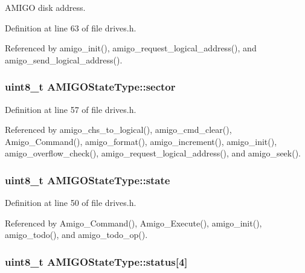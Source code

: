 A\+M\+I\+GO disk address. 



Definition at line 63 of file drives.\+h.



Referenced by amigo\+\_\+init(), amigo\+\_\+request\+\_\+logical\+\_\+address(), and amigo\+\_\+send\+\_\+logical\+\_\+address().

\subsubsection[{\texorpdfstring{sector}{sector}}]{\setlength{\rightskip}{0pt plus 5cm}uint8\+\_\+t A\+M\+I\+G\+O\+State\+Type\+::sector}\hypertarget{structAMIGOStateType_a90615dad99e4fb6852b176bf6712f40b}{}\label{structAMIGOStateType_a90615dad99e4fb6852b176bf6712f40b}


Definition at line 57 of file drives.\+h.



Referenced by amigo\+\_\+chs\+\_\+to\+\_\+logical(), amigo\+\_\+cmd\+\_\+clear(), Amigo\+\_\+\+Command(), amigo\+\_\+format(), amigo\+\_\+increment(), amigo\+\_\+init(), amigo\+\_\+overflow\+\_\+check(), amigo\+\_\+request\+\_\+logical\+\_\+address(), and amigo\+\_\+seek().

\subsubsection[{\texorpdfstring{state}{state}}]{\setlength{\rightskip}{0pt plus 5cm}uint8\+\_\+t A\+M\+I\+G\+O\+State\+Type\+::state}\hypertarget{structAMIGOStateType_ab3ba7202566a784c93d437960f8f332e}{}\label{structAMIGOStateType_ab3ba7202566a784c93d437960f8f332e}


Definition at line 50 of file drives.\+h.



Referenced by Amigo\+\_\+\+Command(), Amigo\+\_\+\+Execute(), amigo\+\_\+init(), amigo\+\_\+todo(), and amigo\+\_\+todo\+\_\+op().

\subsubsection[{\texorpdfstring{status}{status}}]{\setlength{\rightskip}{0pt plus 5cm}uint8\+\_\+t A\+M\+I\+G\+O\+State\+Type\+::status\mbox{[}4\mbox{]}}\hypertarget{structAMIGOStateType_a20ecb3cbbcb1fe4746c2d38edc125412}{}\label{structAMIGOStateType_a20ecb3cbbcb1fe4746c2d38edc125412}


